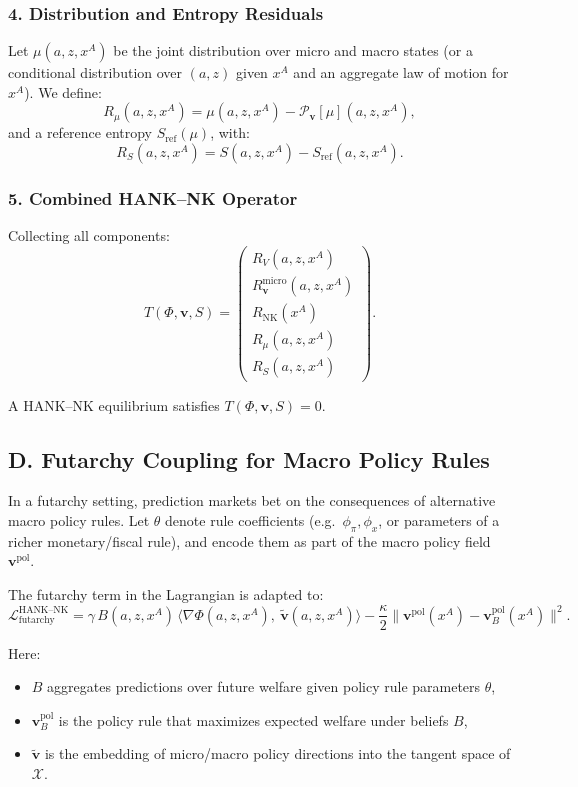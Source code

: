 \documentclass[12pt]{article}
\begin{document}
\subsubsection*{4. Distribution and Entropy Residuals}

Let $\mu(a,z,x^A)$ be the joint distribution over micro and macro
states (or a conditional distribution over $(a,z)$ given $x^A$ and an
aggregate law of motion for $x^A$). We define:
\[
R_\mu(a,z,x^A)
=
\mu(a,z,x^A) - \mathcal{P}_{\mathbf{v}}[\mu](a,z,x^A),
\]
and a reference entropy $S_{\text{ref}}(\mu)$, with:
\[
R_S(a,z,x^A)
=
S(a,z,x^A) - S_{\text{ref}}(a,z,x^A).
\]

\subsubsection*{5. Combined HANK--NK Operator}

Collecting all components:
\[
T(\Phi,\mathbf{v},S)
=
\begin{pmatrix}
R_V(a,z,x^A) \\
R_{\mathbf{v}}^{\text{micro}}(a,z,x^A) \\
R_{\text{NK}}(x^A) \\
R_\mu(a,z,x^A) \\
R_S(a,z,x^A)
\end{pmatrix}.
\]

A HANK--NK equilibrium satisfies $T(\Phi,\mathbf{v},S)=0$.

\subsection*{D. Futarchy Coupling for Macro Policy Rules}

In a futarchy setting, prediction markets bet on the consequences of
alternative macro policy rules. Let $\theta$ denote rule coefficients
(e.g.\ $\phi_\pi,\phi_x$, or parameters of a richer monetary/fiscal
rule), and encode them as part of the macro policy field
$\mathbf{v}^{\text{pol}}$.

The futarchy term in the Lagrangian is adapted to:
\[
\mathcal{L}_{\text{futarchy}}^{\text{HANK--NK}}
=
\gamma\, B(a,z,x^A)\,
    \langle \nabla \Phi(a,z,x^A),\ \tilde{\mathbf{v}}(a,z,x^A) \rangle
- \frac{\kappa}{2}
    \|\mathbf{v}^{\text{pol}}(x^A) - \mathbf{v}^{\text{pol}}_B(x^A)\|^2.
\]

Here:
\begin{itemize}
    \item $B$ aggregates predictions over future welfare given policy
    rule parameters $\theta$,
    \item $\mathbf{v}^{\text{pol}}_B$ is the policy rule that maximizes
    expected welfare under beliefs $B$,
    \item $\tilde{\mathbf{v}}$ is the embedding of micro/macro policy
    directions into the tangent space of $\mathcal{X}$.
\end{itemize}
\end{document}

